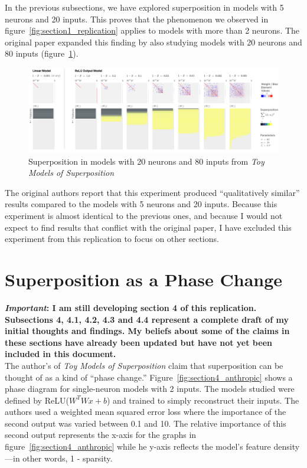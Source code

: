 \documentclass{article} %
\begin{document}
In the previous subsections, we have explored superposition in models with 5
neurons and 20 inputs. This proves that the phenomenon we observed in figure~\ref{fig:section1_replication}
applies to models with more than 2 neurons. The original paper expanded this 
finding by also studying models with 20 neurons and 80 inputs (figure~\ref{fig:section3_anthropic2}). \\

\begin{figure}[h]
    \centering
    \includegraphics[width=0.99\linewidth]{demonstrating_superposition/images/anthropic_section3_part2.png}
    \captionsetup{font=footnotesize, width=0.7\linewidth} %
    \caption{
        Superposition in models with 20 neurons and 80 inputs from \textit{Toy Models of Superposition}\cite{elhage2022toy}
    }
    \label{fig:section3_anthropic2}
\end{figure}

The original authors report that this experiment produced ``qualitatively similar''
results compared to the models with 5 neurons and 20 inputs. Because this experiment 
is almost identical to the previous ones, and because I would not expect to find 
results that conflict with the original paper, I have excluded this experiment 
from this replication to focus on other sections. \\

\section{Superposition as a Phase Change}

\textbf{\textit{Important}: I am still developing section 4 of this replication. 
Subsections 4, 4.1, 4.2, 4.3 and 4.4 represent a complete draft of my initial 
thoughts and findings. My beliefs about some of the claims in these sections
have already been updated but have not yet been included in this document.} \\

The author's of \textit{Toy Models of Superposition} claim that superposition
can be thought of as a kind of ``phase change.'' Figure~\ref{fig:section4_anthropic}
shows a phase diagram for single-neuron models with 2 inputs. The models studied were
defined by ReLU($W^TWx + b$) and trained to simply reconstruct their inputs. The authors 
used a weighted mean squared error loss where the importance of 
the second output was varied between 0.1 and 10. The relative importance of this
second output represents the x-axis for the graphs in figure~\ref{fig:section4_anthropic}
while he y-axis reflects the model's feature density---in other words, 1 - sparsity.
\end{document}
